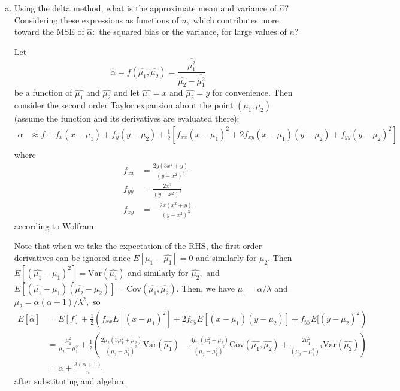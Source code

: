 \documentclass{article}
\newcommand{\var}{\mathrm{Var}}
\newcommand{\cov}{\mathrm{Cov}}
\begin{document}
\begin{enumerate}
\begin{enumerate}[(a)]
\begin{soln}
				\end{soln}

			\item Using the delta method, what is the approximate mean and variance of $\hat{\alpha}?$ Considering these expressions as functions of $n,$ which contributes more toward the MSE of $\hat{\alpha}:$ the squared bias or the variance, for large values of $n?$
				\begin{soln}
					Let \[\hat{\alpha}=f(\hat{\mu_1}, \hat{\mu_2})=\frac{\hat{\mu_1^2}}{\hat{\mu_2}-\hat{\mu_1^2}}\] be a function of $\hat{\mu_1}$ and $\hat{\mu_2}$ and let $\hat{\mu_1}=x$ and $\hat{\mu_2}=y$ for convenience. Then consider the second order Taylor expansion about the point $(\mu_1, \mu_2)$ (assume the function and its derivatives are evaluated there):
					\begin{align*}
						\alpha &\approx f + f_x(x-\mu_1) + f_y(y-\mu_2) + \frac{1}{2}\left[ f_{xx} (x-\mu_1)^2 + 2f_{xy}(x-\mu_1)(y-\mu_2)+f_{yy}(y-\mu_2)^2 \right] \\
					\end{align*} where 
					\begin{align*}
						f_{xx} &= \frac{2y(3x^2+y)}{(y-x^2)^3} \\
						f_{yy} &= \frac{2x^2}{(y-x^2)^3} \\
						f_{xy} &= -\frac{2x(x^2+y)}{(y-x^2)^3}
					\end{align*} according to Wolfram.

					Note that when we take the expectation of the RHS, the first order derivatives can be ignored since $E[\mu_1-\hat{\mu_1}]=0$ and similarly for $\mu_2.$ Then $E[(\hat{\mu_1}-\mu_1)^2]=\var(\hat{\mu_1})$ and similarly for $\hat{\mu_2},$ and $E[(\hat{\mu_1}-\mu_1)(\hat{\mu_2}-\mu_2)]=\cov(\hat{\mu_1}, \hat{\mu_2})$. Then, we have $\mu_1=\alpha/\lambda$ and $\mu_2=\alpha(\alpha+1)/\lambda^2,$ so
					\begin{align*}
						E[\hat{\alpha}] &= E[f] + \frac{1}{2}\left( f_{xx} E[(x-\mu_1)^2] + 2f_{xy}E[(x-\mu_1)(y-\mu_2)] + f_{yy} E[(y-\mu_2)^2\right) \\
							&= \frac{\mu_1^2}{\mu_2-\mu_1^2}+\frac{1}{2}\left( \frac{2\mu_2(3\mu_1^2+\mu_2)}{(\mu_2-\mu_1^2)^3}\var(\hat{\mu_1})  -\frac{4\mu_1(\mu_1^2+\mu_2)}{(\mu_2-\mu_1^2)^3}\cov(\hat{\mu_1}, \hat{\mu_2}) + \frac{2\mu_1^2}{(\mu_2-\mu_1^2)^3}\var(\hat{\mu_2}) \right) \\
							&= \alpha+\frac{3(\alpha+1)}{n}
					\end{align*} after substituting and algebra. 
			

\end{soln}
\end{enumerate}
\end{enumerate}
\end{document}
